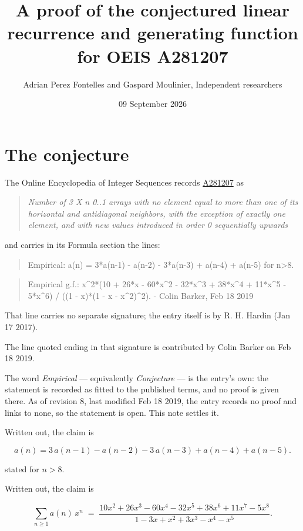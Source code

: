 \documentclass[11pt]{article}
\title{A proof of the conjectured linear recurrence and generating function for OEIS A281207}
\author{Adrian Perez Fontelles and Gaspard Moulinier, Independent researchers}
\date{09 September 2026}
\theoremstyle{definition}
\begin{document}
\maketitle
\section{The conjecture}

The Online Encyclopedia of Integer Sequences records \href{https://oeis.org/A281207}{A281207} as

\begin{quote}\itshape Number of 3 X n 0..1 arrays with no element equal to more than one of its horizontal and antidiagonal neighbors, with the exception of exactly one element, and with new values introduced in order 0 sequentially upwards\end{quote}

and carries in its Formula section the lines:

\begin{quote}\ttfamily Empirical: a(n) = 3*a(n-1) - a(n-2) - 3*a(n-3) + a(n-4) + a(n-5) for n>8.\end{quote}

\begin{quote}\ttfamily Empirical g.f.: x\textasciicircum{}2*(10 + 26*x - 60*x\textasciicircum{}2 - 32*x\textasciicircum{}3 + 38*x\textasciicircum{}4 + 11*x\textasciicircum{}5 - 5*x\textasciicircum{}6) / ((1 - x)*(1 - x - x\textasciicircum{}2)\textasciicircum{}2). - Colin Barker, Feb 18 2019\end{quote}

That line carries no separate signature; the entry itself is by R. H. Hardin (Jan 17 2017).

The line quoted ending in that signature is contributed by Colin Barker on Feb 18 2019.

The word {\itshape Empirical} --- equivalently {\itshape Conjecture} --- is the entry's own: the statement is recorded as fitted to the published terms, and no proof is given there. As of revision 8, last modified Feb 18 2019, the entry records no proof and links to none, so the statement is open. This note settles it.

Written out, the claim is

\[a(n) = 3\,a(n-1) - a(n-2) - 3\,a(n-3) + a(n-4) + a(n-5).\]

stated for $n > 8$.

Written out, the claim is

\[\sum_{n \ge 1} a(n)\,x^n \;=\; \frac{10x^{2} + 26x^{3} - 60x^{4} - 32x^{5} + 38x^{6} + 11x^{7} - 5x^{8}}{1 - 3x + x^{2} + 3x^{3} - x^{4} - x^{5}}.\]
\end{document}
